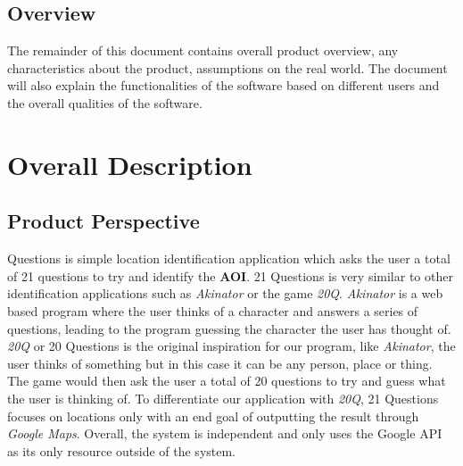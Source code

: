 \documentclass[titlepage]{article}
\begin{document}
		\subsection{Overview}
		\label{sub:overview}
		The remainder of this document contains overall product overview, any characteristics about the product, assumptions on the real world. The document will also explain the functionalities of the software based on different users and the overall qualities of the software.  
		
		
		
		\section{Overall Description}
		\label{sec:overall_description}
		
		\subsection{Product Perspective}
		\label{sub:product_perspective}
		\indent {} Questions is simple location identification application which asks the user a total of 21 questions to try and identify the \textbf{AOI}. 21 Questions is very similar to other identification applications such as \textit{Akinator} or the game \textit{20Q}. \textit{Akinator} is a web based program where the user thinks of a character and answers a series of questions, leading to the program guessing the character the user has thought of. \textit{20Q} or 20 Questions is the original inspiration for our program, like \textit{Akinator}, the user thinks of something but in this case it can be any person, place or thing. The game would then ask the user a total of 20 questions to try and guess what the user is thinking of. To differentiate our application with \textit{20Q}, 21 Questions focuses on locations only with an end goal of outputting the result through \textit{Google Maps}. Overall, the system is independent and only uses the Google API as its only resource outside of the system.
		
\end{document}

